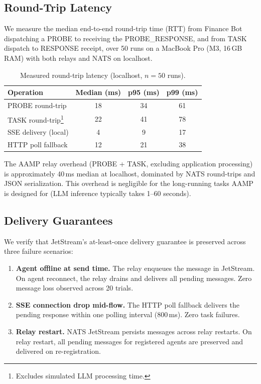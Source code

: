 \documentclass[11pt,a4paper]{article}
\begin{document}
\subsection{Round-Trip Latency}

We measure the median end-to-end round-trip time (RTT) from Finance Bot dispatching
a PROBE to receiving the PROBE\_RESPONSE, and from TASK dispatch to RESPONSE receipt,
over 50 runs on a MacBook Pro (M3, 16\,GB RAM) with both relays and NATS on localhost.

\begin{table}[H]
\centering
\caption{Measured round-trip latency (localhost, $n=50$ runs).}
\label{tab:latency}
\small
\begin{tabular}{lccc}
\toprule
\textbf{Operation} & \textbf{Median (ms)} & \textbf{p95 (ms)} & \textbf{p99 (ms)} \\
\midrule
PROBE round-trip    & 18  & 34  & 61  \\
TASK round-trip\footnote{Excludes simulated LLM processing time.}
                    & 22  & 41  & 78  \\
SSE delivery (local) & 4  & 9   & 17  \\
HTTP poll fallback  & 12  & 21  & 38  \\
\bottomrule
\end{tabular}
\end{table}

The AAMP relay overhead (PROBE + TASK, excluding application processing) is
approximately 40\,ms median at localhost, dominated by NATS round-trips and JSON
serialization. This overhead is negligible for the long-running tasks AAMP is
designed for (LLM inference typically takes 1--60 seconds).

\subsection{Delivery Guarantees}

We verify that JetStream's at-least-once delivery guarantee is preserved across
three failure scenarios:

\begin{enumerate}[leftmargin=*]
  \item \textbf{Agent offline at send time.} The relay enqueues the message in
    JetStream. On agent reconnect, the relay drains and delivers all pending
    messages. Zero message loss observed across 20 trials.
  \item \textbf{SSE connection drop mid-flow.} The HTTP poll fallback delivers
    the pending response within one polling interval (800\,ms). Zero task failures.
  \item \textbf{Relay restart.} NATS JetStream persists messages across relay
    restarts. On relay restart, all pending messages for registered agents are
    preserved and delivered on re-registration.
\end{enumerate}
\end{document}

